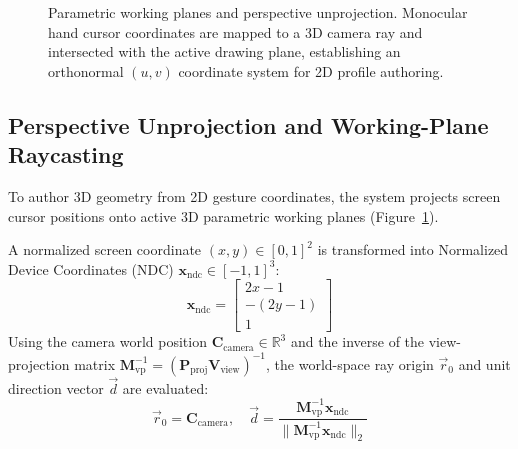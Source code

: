\begin{figure}[t]
    \centering
    \caption{Parametric working planes and perspective unprojection. Monocular hand cursor coordinates are mapped to a 3D camera ray and intersected with the active drawing plane, establishing an orthonormal $(u, v)$ coordinate system for 2D profile authoring.}
    \label{fig:working_planes}
\end{figure}

\subsection{Perspective Unprojection and Working-Plane Raycasting}
To author 3D geometry from 2D gesture coordinates, the system projects screen cursor positions onto active 3D parametric working planes (Figure~\ref{fig:working_planes}).

A normalized screen coordinate $(x, y) \in [0, 1]^2$ is transformed into Normalized Device Coordinates (NDC) $\mathbf{x}_{\text{ndc}} \in [-1, 1]^3$:
\begin{equation}
\mathbf{x}_{\text{ndc}} = \begin{bmatrix} 2x - 1 \\ -(2y - 1) \\ 1 \end{bmatrix}
\label{eq:ndc}
\end{equation}
Using the camera world position $\mathbf{C}_{\text{camera}} \in \mathbb{R}^3$ and the inverse of the view-projection matrix $\mathbf{M}_{\text{vp}}^{-1} = (\mathbf{P}_{\text{proj}} \mathbf{V}_{\text{view}})^{-1}$, the world-space ray origin $\vec{r}_0$ and unit direction vector $\vec{d}$ are evaluated:
\begin{equation}
\vec{r}_0 = \mathbf{C}_{\text{camera}}, \quad \vec{d} = \frac{\mathbf{M}_{\text{vp}}^{-1} \mathbf{x}_{\text{ndc}}}{\|\mathbf{M}_{\text{vp}}^{-1} \mathbf{x}_{\text{ndc}}\|_2}
\label{eq:ray}
\end{equation}

